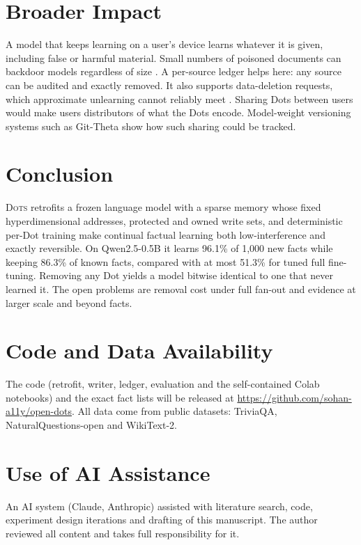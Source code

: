 \documentclass[11pt]{article}
\newcommand{\sys}{\textsc{Dots}}
\begin{document}
\section{Broader Impact}

A model that keeps learning on a user's device learns whatever it is given, including false or harmful material. Small numbers of poisoned documents can backdoor models regardless of size \citep{souly2025poisoning}. A per-source ledger helps here: any source can be audited and exactly removed. It also supports data-deletion requests, which approximate unlearning cannot reliably meet \citep{zhang2025quant}. Sharing Dots between users would make users distributors of what the Dots encode. Model-weight versioning systems such as Git-Theta \citep{kandpal2023gittheta} show how such sharing could be tracked.

\section{Conclusion}

\sys{} retrofits a frozen language model with a sparse memory whose fixed hyperdimensional addresses, protected and owned write sets, and deterministic per-Dot training make continual factual learning both low-interference and exactly reversible. On Qwen2.5-0.5B it learns 96.1\% of 1{,}000 new facts while keeping 86.3\% of known facts, compared with at most 51.3\% for tuned full fine-tuning. Removing any Dot yields a model bitwise identical to one that never learned it. The open problems are removal cost under full fan-out and evidence at larger scale and beyond facts.

\section*{Code and Data Availability}
The code (retrofit, writer, ledger, evaluation and the self-contained Colab notebooks) and the exact fact lists will be released at \url{https://github.com/sohan-a11y/open-dots}. All data come from public datasets: TriviaQA, NaturalQuestions-open and WikiText-2.

\section*{Use of AI Assistance}
An AI system (Claude, Anthropic) assisted with literature search, code, experiment design iterations and drafting of this manuscript. The author reviewed all content and takes full responsibility for it.
\end{document}
